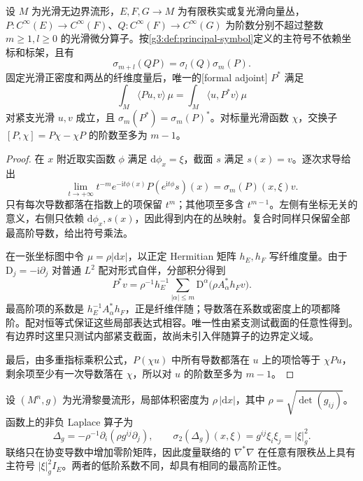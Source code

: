 \begin{proposition}\label{g3:prop:symbol-calculus}
	设 \(M\) 为光滑无边界流形，\(E,F,G\to M\) 为有限秩实或复光滑向量丛，\(P:C^\infty(E)\to C^\infty(F)\)、\(Q:C^\infty(F)\to C^\infty(G)\) 为阶数分别不超过整数 \(m\ge1,l\ge0\) 的光滑微分算子。按\cref{g3:def:principal-symbol}定义的主符号不依赖坐标和标架，且有
	\[
		\sigma_{m+l}(QP)=\sigma_l(Q)\sigma_m(P).
	\]
	固定光滑正密度和两丛的纤维度量后，唯一的[formal adjoint] \(P^*\) 满足
	\[
		\int_M\langle Pu,v\rangle\,\mu
		=\int_M\langle u,P^*v\rangle\,\mu
	\]
	对紧支光滑 \(u,v\) 成立，且 \(\sigma_m(P^*)=\sigma_m(P)^*\)。对标量光滑函数 \(\chi\)，交换子 \([P,\chi]=P\chi-\chi P\) 的阶数至多为 \(m-1\)。
\end{proposition}
\begin{proof}
	在 \(x\) 附近取实函数 \(\phi\) 满足 \(\mathrm d\phi_x=\xi\)，截面 \(s\) 满足 \(s(x)=v\)。逐次求导给出
	\[
		\lim_{t\to+\infty}t^{-m}e^{-\mathrm it\phi(x)}P(e^{\mathrm it\phi}s)(x)
		=\sigma_m(P)(x,\xi)v.
	\]
	只有每次导数都落在指数上的项保留 \(t^m\)；其他项至多含 \(t^{m-1}\)。左侧有坐标无关的意义，右侧只依赖 \(\mathrm d\phi_x,s(x)\)，因此得到内在的丛映射。复合时同样只保留全部最高阶导数，给出符号乘法。

	在一张坐标图中令 \(\mu=\rho|\mathrm dx|\)，以正定 Hermitian 矩阵 \(h_E,h_F\) 写纤维度量。由于 \(\mathrm D_j=-\mathrm i\partial_j\) 对普通 \(L^2\) 配对形式自伴，分部积分得到
	\[
		P^*v=\rho^{-1}h_E^{-1}\sum_{|\alpha|\le m}
		\mathrm D^\alpha\bigl(\rho A_\alpha^*h_Fv\bigr).
	\]
	最高阶项的系数是 \(h_E^{-1}A_\alpha^*h_F\)，正是纤维伴随；导数落在系数或密度上的项都降阶。配对恒等式保证这些局部表达式相容。唯一性由紧支测试截面的任意性得到。有边界时这里只测试内部紧支截面，故尚未引入伴随算子的边界定义域。

	最后，由多重指标乘积公式，\(P(\chi u)\) 中所有导数都落在 \(u\) 上的项恰等于 \(\chi Pu\)，剩余项至少有一次导数落在 \(\chi\)，所以对 \(u\) 的阶数至多为 \(m-1\)。
\end{proof}

\begin{example}\label{g3:exm:symbol-laplace}
	设 \((M^n,g)\) 为光滑黎曼流形，局部体积密度为 \(\rho\,|\mathrm dx|\)，其中 \(\rho=\sqrt{\det(g_{ij})}\)。函数上的非负 Laplace 算子为
	\[
		\Delta_g=-\rho^{-1}\partial_i(\rho g^{ij}\partial_j),
		\qquad \sigma_2(\Delta_g)(x,\xi)=g^{ij}\xi_i\xi_j=|\xi|_g^2.
	\]
	联络只在协变导数中增加零阶矩阵，因此度量联络的 \(\nabla^*\nabla\) 在任意有限秩丛上具有主符号 \(|\xi|_g^2I_E\)。两者的低阶系数不同，却具有相同的最高阶正性。
\end{example}

